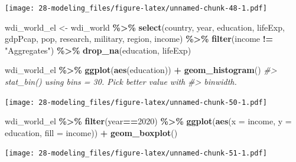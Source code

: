 \documentclass[
  xelatex, ja=standard]{bxjsbook}
\newenvironment{Shaded}{\begin{snugshade}}{\end{snugshade}}
\newcommand{\AttributeTok}[1]{\textcolor[rgb]{0.13,0.29,0.53}{#1}}
\newcommand{\CommentTok}[1]{\textcolor[rgb]{0.56,0.35,0.01}{\textit{#1}}}
\newcommand{\DecValTok}[1]{\textcolor[rgb]{0.00,0.00,0.81}{#1}}
\newcommand{\FunctionTok}[1]{\textcolor[rgb]{0.13,0.29,0.53}{\textbf{#1}}}
\newcommand{\NormalTok}[1]{#1}
\newcommand{\OtherTok}[1]{\textcolor[rgb]{0.56,0.35,0.01}{#1}}
\newcommand{\SpecialCharTok}[1]{\textcolor[rgb]{0.81,0.36,0.00}{\textbf{#1}}}
\newcommand{\StringTok}[1]{\textcolor[rgb]{0.31,0.60,0.02}{#1}}
\theoremstyle{definition}
\theoremstyle{definition}
\theoremstyle{definition}
\theoremstyle{definition}
\theoremstyle{remark}
\begin{document}
\texttt{[image: 28-modeling\_files/figure-latex/unnamed-chunk-48-1.pdf]}

\begin{Shaded}
\begin{Highlighting}[]
\NormalTok{wdi\_world\_el }\OtherTok{\textless{}{-}}\NormalTok{ wdi\_world }\SpecialCharTok{\%\textgreater{}\%} \FunctionTok{select}\NormalTok{(country, year, education, lifeExp, gdpPcap, pop, research, military, region, income) }\SpecialCharTok{\%\textgreater{}\%} \FunctionTok{filter}\NormalTok{(income }\SpecialCharTok{!=} \StringTok{"Aggregates"}\NormalTok{) }\SpecialCharTok{\%\textgreater{}\%} \FunctionTok{drop\_na}\NormalTok{(education, lifeExp)}
\end{Highlighting}
\end{Shaded}

\begin{Shaded}
\begin{Highlighting}[]
\NormalTok{wdi\_world\_el }\SpecialCharTok{\%\textgreater{}\%} \FunctionTok{ggplot}\NormalTok{(}\FunctionTok{aes}\NormalTok{(education)) }\SpecialCharTok{+} \FunctionTok{geom\_histogram}\NormalTok{()}
\CommentTok{\#\textgreater{} \textasciigrave{}stat\_bin()\textasciigrave{} using \textasciigrave{}bins = 30\textasciigrave{}. Pick better value with}
\CommentTok{\#\textgreater{} \textasciigrave{}binwidth\textasciigrave{}.}
\end{Highlighting}
\end{Shaded}

\texttt{[image: 28-modeling\_files/figure-latex/unnamed-chunk-50-1.pdf]}

\begin{Shaded}
\begin{Highlighting}[]
\NormalTok{wdi\_world\_el }\SpecialCharTok{\%\textgreater{}\%} \FunctionTok{filter}\NormalTok{(year}\SpecialCharTok{==}\DecValTok{2020}\NormalTok{) }\SpecialCharTok{\%\textgreater{}\%} \FunctionTok{ggplot}\NormalTok{(}\FunctionTok{aes}\NormalTok{(}\AttributeTok{x =}\NormalTok{ income, }\AttributeTok{y =}\NormalTok{ education, }\AttributeTok{fill =}\NormalTok{ income)) }\SpecialCharTok{+} \FunctionTok{geom\_boxplot}\NormalTok{()}
\end{Highlighting}
\end{Shaded}

\texttt{[image: 28-modeling\_files/figure-latex/unnamed-chunk-51-1.pdf]}
\end{document}
